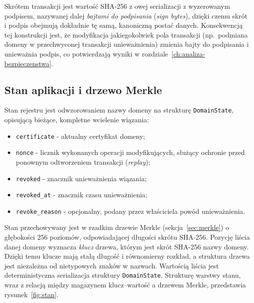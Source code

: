 Skrótem transakcji jest wartość SHA-256 z owej serializacji z wyzerowanym podpisem, nazywanej dalej \emph{bajtami do podpisania} (\emph{sign bytes}), dzięki czemu skrót i podpis obejmują dokładnie tę samą, kanoniczną postać danych. Konsekwencją tej konstrukcji jest, że modyfikacja jakiegokolwiek pola transakcji (np.\ podmiana domeny w przechwyconej transakcji unieważnienia) zmienia bajty do podpisania i unieważnia podpis, co potwierdzają wyniki w rozdziale~\ref{ch:analiza-bezpieczenstwa}.

\subsection{Stan aplikacji i drzewo Merkle}
\label{subsec:stan-merkle}

Stan rejestru jest odwzorowaniem nazwy domeny na strukturę \texttt{DomainState}, opisującą bieżące, kompletne wcielenie wiązania:
\begin{itemize}
    \item \texttt{certificate} - aktualny certyfikat domeny;
    \item \texttt{nonce} - licznik wykonanych operacji modyfikujących, służący ochronie przed ponownym odtworzeniem transakcji (\emph{replay});
    \item \texttt{revoked} - znacznik unieważnienia wiązania;
    \item \texttt{revoked\_at} - znacznik czasu unieważnienia;
    \item \texttt{revoke\_reason} - opcjonalny, podany przez właściciela powód unieważnienia.
\end{itemize}

Stan przechowywany jest w rzadkim drzewie Merkle (sekcja~\ref{sec:merkle}) o głębokości 256 poziomów, odpowiadającej długości skrótu SHA-256. Pozycję liścia danej domeny wyznacza \emph{klucz} drzewa, którym jest skrót SHA-256 nazwy domeny. Dzięki temu klucze mają stałą długość i równomierny rozkład, a struktura drzewa jest niezależna od nietypowych znaków w nazwach. Wartością liścia jest deterministyczna serializacja struktury \texttt{DomainState}. Strukturę warstwy stanu, wraz z relacją między magazynem klucz--wartość a drzewem Merkle, przedstawia rysunek~\ref{fig:stan}.

